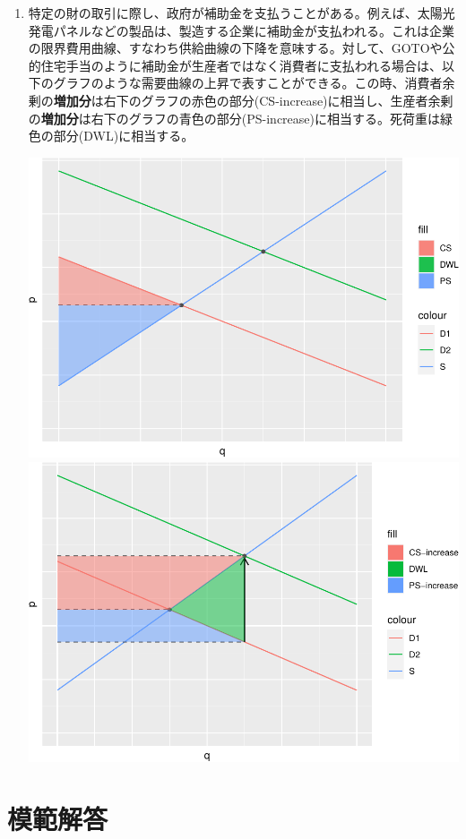 \documentclass[
]{ltjarticle}
\begin{document}
\begin{enumerate}
\item 特定の財の取引に際し、政府が補助金を支払うことがある。例えば、太陽光発電パネルなどの製品は、製造する企業に補助金が支払われる。これは企業の限界費用曲線、すなわち供給曲線の下降を意味する。対して、GOTOや公的住宅手当のように補助金が生産者ではなく消費者に支払われる場合は、以下のグラフのような需要曲線の上昇で表すことができる。この時、消費者余剰の\textbf{増加分}は右下のグラフの赤色の部分(CS-increase)に相当し、生産者余剰の\textbf{増加分}は右下のグラフの青色の部分(PS-increase)に相当する。死荷重は緑色の部分(DWL)に相当する。  



\includegraphics[width=0.5\linewidth,height=0.8\textheight]{group-report_files/figure-latex/unnamed-chunk-3-1} \includegraphics[width=0.5\linewidth,height=0.8\textheight]{group-report_files/figure-latex/unnamed-chunk-3-2} 


\end{enumerate}

\newpage

\hypertarget{ux6a21ux7bc4ux89e3ux7b54}{%
\section{模範解答}\label{ux6a21ux7bc4ux89e3ux7b54}}
\end{document}
